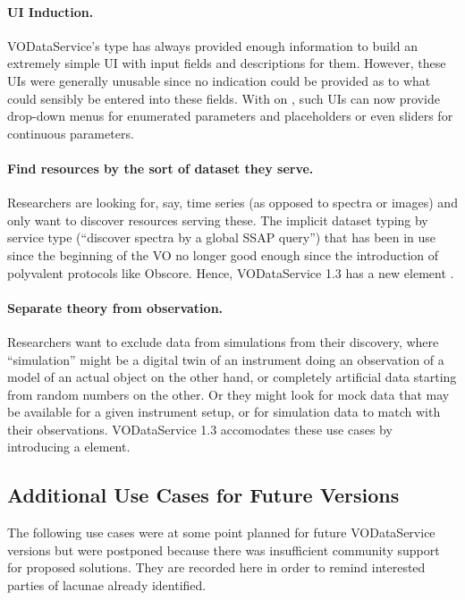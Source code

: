 \documentclass[11pt,a4paper]{ivoa}
\begin{document}
\paragraph{UI Induction.} VODataService's  type has
always provided enough information to build an extremely simple UI with
input fields and descriptions for them.  However, these UIs were
generally unusable since no indication could be provided as to what
could sensibly be entered into these fields.  With  on
, such UIs can now provide drop-down menus for
enumerated parameters and placeholders or even sliders for continuous
parameters.

\paragraph{Find resources by the sort of dataset they serve.}
Researchers are looking for, say, time series (as opposed to spectra or
images) and only want to discover resources serving these.  The implicit
dataset typing by service type (``discover spectra by a global SSAP
query'') that has been in use since the beginning of the VO no longer
good enough since the introduction of polyvalent protocols like Obscore.
Hence, VODataService 1.3 has a new element .

\paragraph{Separate theory from observation.}  Researchers want to
exclude data from simulations from their discovery, where ``simulation''
might be a digital twin of an instrument doing an observation of a model
of an actual object on the other hand, or completely artificial data
starting from random numbers on the other.  Or they might look for mock
data that may be available for a given instrument setup, or for
simulation data to match with their observations.  VODataService 1.3
accomodates these use cases by introducing a  element.


\subsection{Additional Use Cases for Future Versions}

The following use cases were at some point planned for future VODataService
versions but were postponed because there was insufficient community
support for proposed solutions.  They are recorded here in order to
remind interested parties of lacunae already identified.
\end{document}

